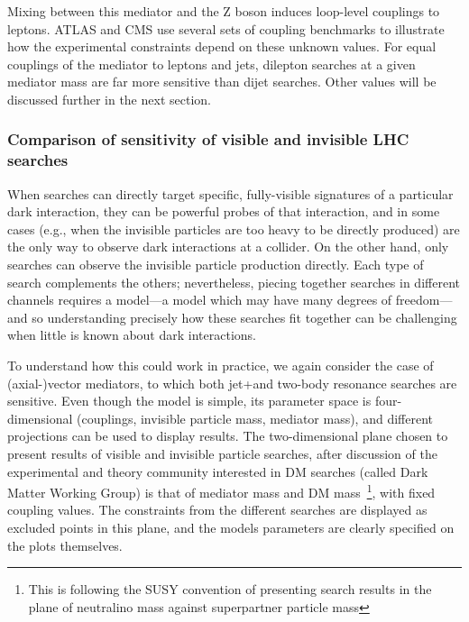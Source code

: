 Mixing between this mediator and the Z boson induces loop-level couplings to leptons. ATLAS and CMS use several sets of coupling benchmarks to illustrate how the experimental constraints depend on these unknown values.
For equal couplings of the mediator to leptons and jets, dilepton searches at a given mediator mass are far more sensitive than dijet searches. Other values will be discussed further in the next section.%



\subsubsection{Comparison of sensitivity of visible and invisible LHC searches}
\label{sub:comparisonVisibleInvisible}

When searches can directly target specific, fully-visible signatures of a particular dark interaction, they can be powerful probes of that interaction, and in some cases (e.g., when the invisible particles are too heavy to be directly produced) are the only way to observe dark interactions at a collider. On the other hand, only \MET searches can observe the invisible particle production directly. Each type of search complements the others; nevertheless, piecing together searches in different channels requires a model---a model which may have many degrees of freedom---and so understanding precisely how these searches fit together can be challenging when little is known about dark interactions.

To understand how this could work in practice, we again consider the case of (axial-)vector mediators, to which both jet+\MET and two-body resonance searches are sensitive. Even though the model is simple, its parameter space is four-dimensional (couplings, invisible particle mass, mediator mass), and different projections can be used to display results. The two-dimensional plane chosen to present results of visible and invisible particle searches, after discussion of the experimental and theory community interested in DM searches (called Dark Matter Working Group) is that of mediator mass and DM mass~\footnote{This is following the SUSY convention of presenting search results in the plane of neutralino mass against superpartner particle mass}, with fixed coupling values. The constraints from the different searches are displayed as excluded points in this plane, and the models parameters are clearly specified on the plots themselves.  

